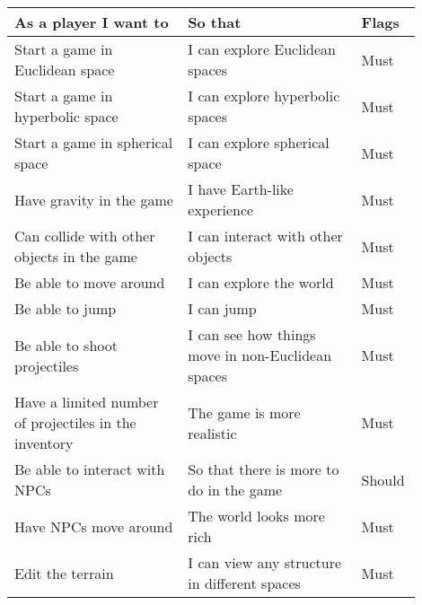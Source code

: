 \documentclass[12pt]{article}
\begin{document}
\begin{table}[H]
    \begin{tabular}{p{0.4\linewidth}|p{0.4\linewidth}|p{0.1\linewidth}}
        \hline
        \textbf{As a player I want to}                            & \textbf{So that}                                                   & \textbf{Flags} \\ \hline
        Start a game in Euclidean space                           & I can explore Euclidean spaces                                     & Must           \\
        Start a game in hyperbolic space                          & I can explore hyperbolic spaces                                    & Must           \\
        Start a game in spherical space                           & I can explore spherical space                                      & Must           \\
        Have gravity in the game                                  & I have Earth-like experience                                       & Must           \\
        Can collide with other objects in the game                & I can interact with other objects                                  & Must           \\
        Be able to move around                                    & I can explore the world                                            & Must           \\
        Be able to jump                                           & I can jump                                                         & Must           \\
        Be able to shoot projectiles                              & I can see how things move in non-Euclidean spaces                  & Must           \\
        Have a limited number of projectiles in the inventory     & The game is more realistic                                         & Must           \\
        Be able to interact with NPCs                             & So that there is more to do in the game                            & Should         \\
        Have NPCs move around                                     & The world looks more rich                                          & Must           \\
        Edit the terrain                                          & I can view any structure in different spaces                       & Must           \\

\end{tabular}
\end{table}
\end{document}
